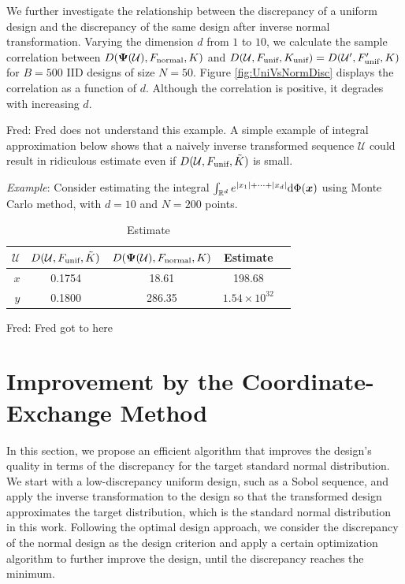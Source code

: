 \documentclass[graybox]{svmult}
\newcommand{\vx}{\boldsymbol{x}}
\newcommand{\vPsi}{\boldsymbol{\Psi}}
\newcommand{\dif}{{\rm d}}
\newcommand{\Udes}{\mathcal{U}}
\newcommand{\unif}{\textup{unif}}
\newcommand{\normal}{\textup{normal}}
\newcommand{\FJH}[1]{{\color{blue}Fred: #1}}
\begin{document}
We further investigate the relationship between the discrepancy of a uniform design and the  discrepancy of the same design after inverse normal transformation.
Varying the dimension $d$ from $1$ to $10$, we calculate the sample correlation between $D(\vPsi(\Udes),F_\normal, K)$ and $D(\Udes,F_\unif,K_\unif) = D(\Udes',F_\unif',K)$ for $B=500$ IID designs of size $N=50$.  Figure \ref{fig:UniVsNormDisc} displays the correlation as a function of $d$. Although the correlation is positive, it degrades with increasing $d$.

\FJH{Fred does not understand this example.}
A simple example of integral approximation below shows that a naively inverse transformed sequence $\Udes$ could result in ridiculous estimate even if $D(\Udes,F_\unif, \tilde{K})$ is small.

\emph{Example}: Consider estimating the integral $\int_{\mathbb{R}^d} e^{|x_1|+\cdots+|x_d|}\dif \Phi(\vx)$ using Monte Carlo method, with $d=10$ and $N=200$ points. 

\begin{table}[htbp]
  \centering
  \caption{Estimate}
    \begin{tabular}{rcccc}
    \hline
   $\Udes$       & $D(\Udes,F_\unif, \tilde{K})$     & $D(\vPsi(\Udes),F_\normal, K)$     & Estimate \\
    \hline
    $x$     &   0.1754    &  18.61     & 198.68 \\
    $y$     &  0.1800      &  286.35     & $1.54\times 10^{32}$ \\
    \hline
    \end{tabular}%
  \label{tab:addlabel}%
\end{table}%

\FJH{Fred got to here}
\section{Improvement by the Coordinate-Exchange Method}\label{sec:CoordEx}

In this section, we propose an efficient algorithm that improves the design's quality in terms of the discrepancy for the target standard normal distribution. 
We start with a low-discrepancy uniform design, such as a Sobol sequence, and apply the inverse transformation to the design so that the transformed design approximates the target distribution, which is the standard normal distribution in this work. 
Following the optimal design approach, we consider the discrepancy of the normal design as the design criterion and apply a certain optimization algorithm to further improve the design, until the discrepancy reaches the minimum.
\end{document}
